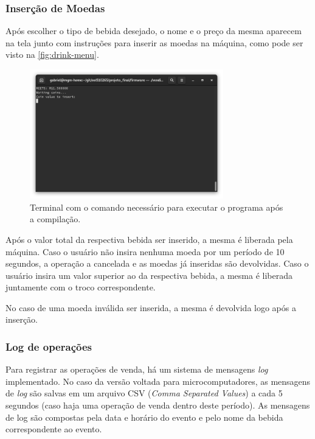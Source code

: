 \subsubsection{Inserção de Moedas}

Após escolher o tipo de bebida desejado, o nome e o preço da mesma aparecem na tela junto com instruções para inserir as moedas na máquina, como pode ser visto na \autoref{fig:drink-menu}.

\begin{figure}[!ht]
    \begin{center}
        \includegraphics[width=0.75\textwidth]{figures/drink-menu.png}
        \caption{Terminal com o comando necessário para executar o programa após a compilação.}
        \label{fig:drink-menu}
    \end{center}
\end{figure}

Após o valor total da respectiva bebida ser inserido, a mesma é liberada pela máquina. Caso o usuário não insira nenhuma moeda por um período de 10 segundos, a operação a cancelada e as moedas já inseridas são devolvidas. Caso o usuário insira um valor superior ao da respectiva bebida, a mesma é liberada juntamente com o troco correspondente.

No caso de uma moeda inválida ser inserida, a mesma é devolvida logo após a inserção.

\subsubsection{Log de operações}

Para registrar as operações de venda, há um sistema de mensagens \textit{log} implementado. No caso da versão voltada para microcomputadores, as mensagens de \textit{log} são salvas em um arquivo CSV (\textit{Comma Separated Values}) a cada 5 segundos (caso haja uma operação de venda dentro deste período). As mensagens de log são compostas pela data e horário do evento e pelo nome da bebida correspondente ao evento.
